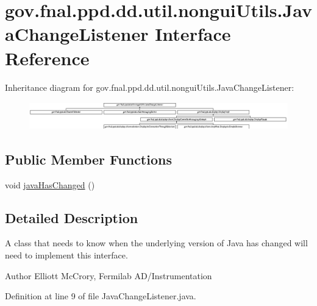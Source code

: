 \hypertarget{interfacegov_1_1fnal_1_1ppd_1_1dd_1_1util_1_1nonguiUtils_1_1JavaChangeListener}{\section{gov.\-fnal.\-ppd.\-dd.\-util.\-nongui\-Utils.\-Java\-Change\-Listener Interface Reference}
\label{interfacegov_1_1fnal_1_1ppd_1_1dd_1_1util_1_1nonguiUtils_1_1JavaChangeListener}
}
Inheritance diagram for gov.\-fnal.\-ppd.\-dd.\-util.\-nongui\-Utils.\-Java\-Change\-Listener\-:\begin{figure}[H]
\begin{center}
\leavevmode
\includegraphics[height=1.209503cm]{interfacegov_1_1fnal_1_1ppd_1_1dd_1_1util_1_1nonguiUtils_1_1JavaChangeListener}
\end{center}
\end{figure}
\subsection*{Public Member Functions}
\begin{DoxyCompactItemize}
\item 
void \hyperlink{interfacegov_1_1fnal_1_1ppd_1_1dd_1_1util_1_1nonguiUtils_1_1JavaChangeListener_af445b8c9b305e7493a08dc75266e2c7b}{java\-Has\-Changed} ()
\end{DoxyCompactItemize}


\subsection{Detailed Description}
A class that needs to know when the underlying version of Java has changed will need to implement this interface.

\begin{DoxyAuthor}{Author}
Elliott Mc\-Crory, Fermilab A\-D/\-Instrumentation 
\end{DoxyAuthor}


Definition at line 9 of file Java\-Change\-Listener.\-java.



